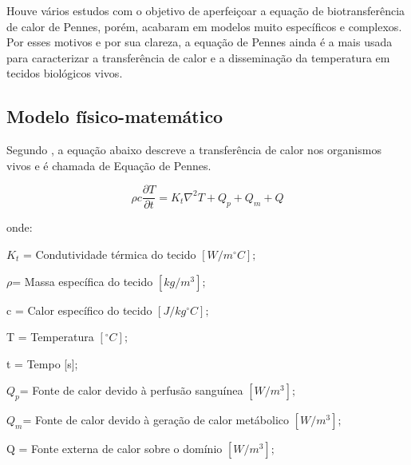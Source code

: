       Houve vários estudos com o objetivo de aperfeiçoar a equação de biotransferência de calor de Pennes, porém, acabaram em modelos muito específicos e complexos. Por esses motivos e por sua clareza, a equação de Pennes ainda é a mais usada para caracterizar a transferência de calor e a disseminação da temperatura em tecidos biológicos vivos.




 \subsection{Modelo físico-matemático}

    Segundo \cite{Carla}, a equação abaixo descreve a transferência de calor nos organismos vivos e é chamada de Equação de Pennes. 
   

  \begin{equation}\rho c\frac{\partial T}{\partial t} = K_{t}\nabla^{2}T+ Q_{p} + Q_{m} + Q \end{equation}


  onde:


 $ K_{t} $ = Condutividade térmica do tecido $[W/m^{\circ}C];$ 

  $\rho $= Massa específica do tecido $[kg/m^3];$

 c = Calor específico do tecido $[J/kg^{\circ}C];$

  T = Temperatura $[^{\circ}C];$

  t = Tempo [s];

   $ Q_{p} $= Fonte de calor devido à perfusão sanguínea $[W/m^3];$


   $Q_{m} $= Fonte de calor devido à geração de calor metábolico $[W/m^3];$

  Q = Fonte externa de calor sobre o domínio $[W/m^3];$

